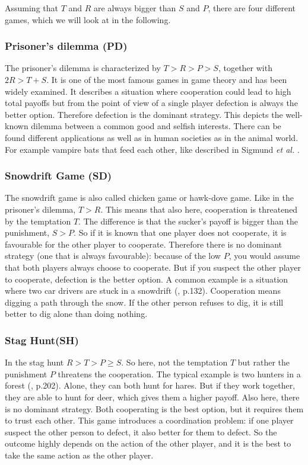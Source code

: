 \documentclass[12pt,oneside,a4paper,fleqn]{article}
\begin{document}
Assuming that $T$ and $R$ are always bigger than $S$ and $P$, there are four different games, which we will look at in the following.

\subsubsection{Prisoner's dilemma (PD)}
The prisoner's dilemma is characterized by $T > R > P > S$, together with $2R > T+S$. It is one of the most famous games in game theory and has been widely examined. It describes a situation where cooperation could lead to high total payoffs but from the point of view of a single player defection is always the better option. Therefore defection is the dominant strategy. This depicts the well-known dilemma between a common good and selfish interests. There can be found different applications as well as in human societies as in the animal world. For example vampire bats that feed each other, like described in Sigmund \emph{et al.} \cite{sigmund1999evolutionary}.

\subsubsection{Snowdrift Game (SD)}
The snowdrift game is also called chicken game or hawk-dove game. Like in the prisoner's dilemma, $T > R$. This means that also here, cooperation is threatened by the temptation $T$. The difference is that the sucker's payoff is bigger than the punishment, $S > P$. So if it is known that one player does not cooperate, it is favourable for the other player to cooperate. Therefore there is no dominant strategy (one that is always favourable): because of the low $P$, you would assume that both players always choose to cooperate. But if you suspect the other player to cooperate, defection is the better option. A common example is a situation where two car drivers are stuck in a snowdrift (\cite{sugden1986economics}, p.132). Cooperation means digging a path through the snow. If the other person refuses to dig, it is still better to dig alone than doing nothing.

\subsubsection{Stag Hunt(SH)}
In the stag hunt $R > T > P \geq S$. So here, not the temptation $T$ but rather the punishment $P$ threatens the cooperation. The typical example is two hunters in a forest (\cite{sugden1986economics}, p.202). Alone, they can both hunt for hares. But if they work together, they are able to hunt for deer, which gives them a higher payoff. Also here, there is no dominant strategy. Both cooperating is the best option, but it requires them to trust each other. This game introduces a coordination problem: if one player suspect the other person to defect, it also better for them to defect. So the outcome highly depends on the action of the other player, and it is the best to take the same action as the other player.
\end{document}
